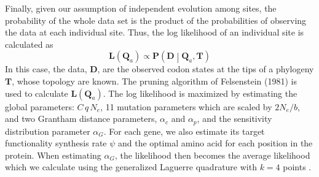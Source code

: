 \documentclass{article}
\newcommand{\Ne}{\ensuremath{{N_e}}\xspace} %
\newcommand{\Pmatrix}{\mathbf{P}\xspace}
\newcommand{\Tmatrix}{\mathbf{T}\xspace}
\newcommand{\Dmatrix}{\mathbf{D}\xspace}
\newcommand{\Lmatrix}{\mathbf{L}\xspace}
\newcommand{\Qmatrix}{\mathbf{Q}\xspace}
\newcommand{\Qmatrixa}{\ensuremath{\Qmatrix_a}\xspace}
\newcommand{\alphac}{\ensuremath{\alpha_c}\xspace}
\newcommand{\alphag}{\ensuremath{\alpha_G}\xspace}
\newcommand{\alphap}{\ensuremath{\alpha_p}\xspace}
\begin{document}
Finally, given our assumption of independent evolution among sites, the probability of the whole data set is the product of the probabilities of observing the data at each individual site.
Thus, the log likelihood of an individual site is calculated as
\begin{equation}
\Lmatrix\left(\Qmatrixa\right) \propto \Pmatrix\left(\Dmatrix\middle|\Qmatrixa,\Tmatrix\right)
\end{equation}
In this case, the data, $\Dmatrix$, are the observed codon states at the tips of a phylogeny $\Tmatrix$, whose topology are known.
The pruning algorithm of Felsenstein (1981) is used to calculate $\Lmatrix(\Qmatrixa)$.
The log likelihood is maximized by estimating the global parameters: $C \, q \, \Ne$, 11 mutation parameters which are scaled by $2 \Ne/b$, and two Grantham distance parameters, $\alphac$ and $\alphap$, and the sensitivity distribution parameter \alphag.
For each gene, we also estimate its target functionality synthesis rate $\psi$  and the optimal amino acid for each position in the protein.
When estimating \alphag, the likelihood then becomes the average likelihood which we calculate using the generalized Laguerre quadrature with $k = 4$ points \citep{Felsenstein2001}.
\end{document}

